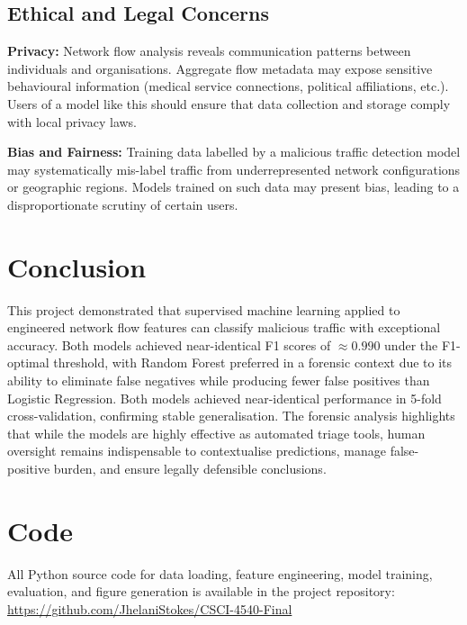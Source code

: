 \documentclass[11pt]{article}
\begin{document}
\subsection{Ethical and Legal Concerns}

\textbf{Privacy:} Network flow analysis reveals communication patterns between
individuals and organisations. Aggregate flow metadata may expose
sensitive behavioural information (medical service connections,
political affiliations, etc.). Users of a model like this should ensure that data collection
and storage comply with local privacy laws. 

\textbf{Bias and Fairness:} Training data labelled by a malicious traffic detection model may systematically mis-label traffic from underrepresented network
configurations or geographic regions. Models trained on such data may
present bias, leading to a disproportionate scrutiny of
certain users.


\section{Conclusion}

This project demonstrated that supervised machine learning applied to
engineered network flow features can classify malicious traffic with
exceptional accuracy. Both models achieved near-identical F1 scores of
$\approx 0.990$ under the F1-optimal threshold, with Random Forest preferred
in a forensic context due to its ability to eliminate false negatives while
producing fewer false positives than Logistic Regression. Both models
achieved near-identical performance in 5-fold cross-validation, confirming
stable generalisation. The forensic analysis highlights that while the
models are highly effective as automated triage tools, human oversight
remains indispensable to contextualise predictions, manage false-positive
burden, and ensure legally defensible conclusions.

\section{Code}
\label{sec:code}

All Python source code for data loading, feature engineering, model training,
evaluation, and figure generation is available in the project repository:\\
\url{https://github.com/JhelaniStokes/CSCI-4540-Final}
\end{document}
